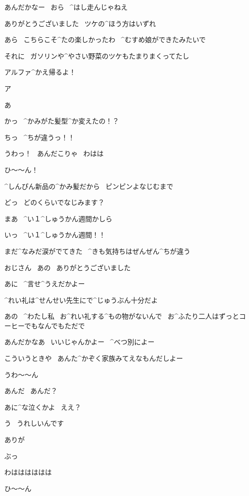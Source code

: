 \Ojisan あんだかなー
\ おら
\ ^{はし}{走}んじゃねえ

\Ojisan ありがとうございました
\ ツケの^{ほう}{方}はいずれ

\Sensei あら
\ こちらこそ^{たの}{楽}しかったわ
\ ^{むすめ}{娘}ができたみたいで

\Sensei それに
\ ガソリンや^{やさい}{野菜}のツケもたまりまくってたし

\Takahiro アルファ^{かえ}{帰}るよ！

\page[96]
\Takahiro ア

\Alpha あ

\Takahiro かっ
\ ^{かみがた}{髪型}^{か}{変}えたの！？

\Alpha ちっ
\ ^{ちが}{違}うっ！！

\Ojisan うわっ！
\ あんだこりゃ
\ わはは

\Alpha ひ〜〜ん！

\Sensei ^{しんぴん}{新品}の^{かみ}{髪}だから
\ ピンピンよなじむまで

\Alpha どっ
\ どのくらいでなじみます？

\page[97]
\Sensei まあ
\ ^{い}{１}^{しゅうかん}{週間}かしら

\Alpha いっ
\ ^{い}{１}^{しゅうかん}{週間}！！

\Alpha まだ^{なみだ}{涙}がでてきた
\ ^{きも}{気持}ちはぜんぜん^{ちが}{違}う

\page[98]
\Alpha おじさん
\ あの
\ ありがとうございました

\Ojisan あに
\ ^{言}{せ}^{う}{え}だかよー

\Ojisan ^{れい}{礼}は^{せんせい}{先生}にで^{じゅうぶん}{十分}だよ

\Alpha あの
\ ^{わたし}{私}
\ お^{れい}{礼}する^{もの}{物}がないんで
\ お^{ふたり}{二人}はずっとコーヒーでもなんでもただで

\Ojisan あんだかなあ
\ いいじゃんかよー
\ ^{べつ}{別}によー

\Ojisan こういうときや
\ あんた^{かぞく}{家族}みてえなもんだしよー

\page[99]
\Alpha うわ〜〜ん

\Ojisan あんだ
\ あんだ？

\Ojisan あに^{な}{泣}くかよ
\ ええ？

\Alpha う
\ うれしいんです

\Alpha ありが

\Takahiro ぶっ

\page[100]
\Takahiro わはははははは

\Alpha ひ〜〜ん


